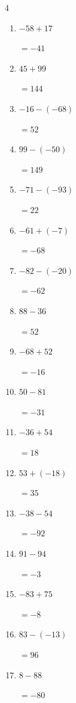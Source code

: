 \begin{multicols}{4}
\begin{enumerate}
  \item $-58+17$

        $=-41$

  \item $45+99$

        $=144$

  \item $-16-(-68)$

        $=52$

  \item $99-(-50)$

        $=149$

  \item $-71-(-93)$

        $=22$

  \item $-61+(-7)$

        $=-68$

  \item $-82-(-20)$

        $=-62$

  \item $88-36$

        $=52$

  \item $-68+52$

        $=-16$

  \item $50-81$

        $=-31$

  \item $-36+54$

        $=18$

  \item $53+(-18)$

        $=35$

  \item $-38-54$

        $=-92$

  \item $91-94$

        $=-3$

  \item $-83+75$

        $=-8$

  \item $83-(-13)$

        $=96$

  \item $8-88$

        $=-80$


\end{enumerate}
\end{multicols}
